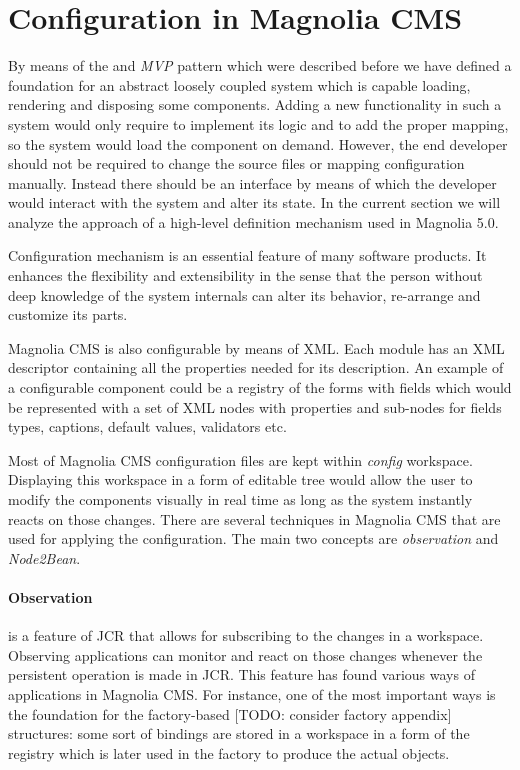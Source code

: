 \section{Configuration in Magnolia CMS}
By means of the  and \emph{MVP} pattern which were
described before we have defined a foundation for an abstract loosely coupled
system which is capable loading, rendering and disposing some components.
Adding a new functionality in such a system would only require to
implement its logic and to add the proper mapping, so the system would load the
component on demand. However, the end developer should not be required to change
the source files or mapping configuration manually. Instead there should be an
interface by means of which the developer would interact with the system and
alter its state. In the current section we will analyze the approach of a
high-level definition mechanism used in Magnolia 5.0.

Configuration mechanism is an essential feature of many software products. It
enhances the flexibility and extensibility in the sense that the person without
deep knowledge of the system internals can alter its behavior, re-arrange and
customize its parts. 

Magnolia CMS is also configurable by means of XML. Each module has an XML
descriptor containing all the properties needed for its description. An example
of a configurable component could be a registry of the forms with fields which
would be represented with a set of XML nodes with properties and sub-nodes for
fields types, captions, default values, validators etc. 

Most of Magnolia CMS configuration files are kept within \emph{config}
workspace. Displaying this workspace in a form of editable tree would allow the
user to modify the components visually in real time as long as the system
instantly reacts on those changes.
There are several techniques in Magnolia CMS that are used for applying the
configuration. The main two concepts are \emph{observation} and \emph{Node2Bean}.

\paragraph{Observation} is a feature of JCR that allows for subscribing to the
changes in a workspace. Observing applications can monitor and react on those
changes whenever the persistent operation is made in JCR. This feature has found
various ways of applications in Magnolia CMS. For instance, one of the most
important ways is the foundation for the factory-based [TODO: consider factory
appendix] structures: some sort of bindings are stored in a workspace in a form
of the registry which is later used in the factory to produce the actual objects.

